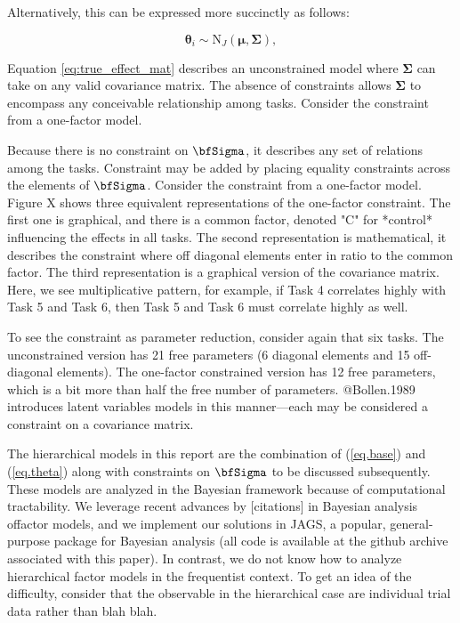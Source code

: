 \documentclass[man, 12pt]{apa7} %
\begin{document}
Alternatively, this can be expressed more succinctly as follows:

\begin{equation} \label{eq:true_effect_mat}
\boldsymbol{\theta}_i \sim \mbox{N}_J(\boldsymbol{\mu},\boldsymbol{\Sigma}),
\end{equation}

Equation \ref{eq:true_effect_mat} describes an unconstrained model where $\boldsymbol{\Sigma}$ can take on any valid covariance matrix. 
The absence of constraints allows $\boldsymbol{\Sigma}$ to encompass any conceivable relationship among tasks. Consider the constraint from a one-factor model.  


Because there is no constraint on $\bfSigma$, it describes any set of relations among the tasks.  Constraint may be added by placing equality constraints across the elements of $\bfSigma$.  Consider the constraint from a one-factor model.  Figure X shows three equivalent representations of the one-factor constraint.  The first one is graphical, and there is a common factor, denoted "C" for *control* influencing the effects in all tasks.  The second representation is mathematical, it describes the constraint where off diagonal elements enter in ratio to the common factor.  The third representation is a graphical version of the covariance matrix.  Here, we see multiplicative pattern, for example, if Task 4 correlates highly with Task 5 and Task 6, then Task 5 and Task 6 must correlate highly as well. 

To see the constraint as parameter reduction, consider again that six tasks.  The unconstrained version has 21 free parameters (6 diagonal elements and 15 off-diagonal elements).  The one-factor constrained version has 12 free parameters, which is a bit more than half the free number of parameters.  @Bollen.1989 introduces latent variables models in this manner---each may be considered a constraint on a covariance matrix.

The hierarchical models in this report are the combination of (\ref{eq.base}) and (\ref{eq.theta}) along with constraints on $\bfSigma$ to be discussed subsequently.  These models are analyzed in the Bayesian framework because of computational tractability.  We leverage recent advances by [citations] in Bayesian analysis offactor models, and we implement our solutions in JAGS, a popular, general-purpose package for Bayesian analysis (all code is available at the github archive associated with this paper).  In contrast, we do not know how to analyze hierarchical factor models in the frequentist context.  To get an idea of the difficulty, consider that the observable in the hierarchical case are individual trial data rather than blah blah.
\end{document}
